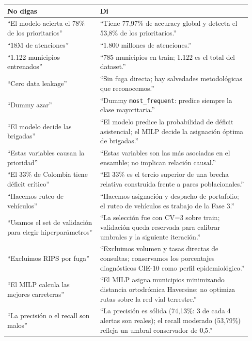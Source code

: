\documentclass[11pt,a4paper]{article}
\newcommand{\code}[1]{\texttt{#1}}
\begin{document}
\begin{table}[H]
\centering
\small
\begin{tabularx}{\textwidth}{@{}L{7.0cm} Y@{}}
\toprule
\textbf{No digas} & \textbf{Di} \\
\midrule
``El modelo acierta el 78\% de los prioritarios'' &
``Tiene 77,97\% de accuracy global y detecta el 53,8\% de los prioritarios.'' \\
``18M de atenciones'' &
``1.800 millones de atenciones.'' \\
``1.122 municipios entrenados'' &
``785 municipios en train; 1.122 es el total del dataset.'' \\
``Cero data leakage'' &
``Sin fuga directa; hay salvedades metodológicas que reconocemos.'' \\
``Dummy azar'' &
``Dummy \code{most_frequent}: predice siempre la clase mayoritaria.'' \\
``El modelo decide las brigadas'' &
``El modelo predice la probabilidad de déficit asistencial; el MILP decide la asignación óptima de brigadas.'' \\
``Estas variables causan la prioridad'' &
``Estas variables son las más asociadas en el ensamble; no implican relación causal.'' \\
``El 33\% de Colombia tiene déficit crítico'' &
``El 33\% es el tercio superior de una brecha relativa construida frente a pares poblacionales.'' \\
``Hacemos ruteo de vehículos'' &
``Hacemos asignación y despacho de portafolio; el ruteo de vehículos es trabajo de la Fase 3.'' \\
``Usamos el set de validación para elegir hiperparámetros'' &
``La selección fue con CV=3 sobre train; validación queda reservada para calibrar umbrales y la siguiente iteración.'' \\
``Excluimos RIPS por fuga'' &
``Excluimos volumen y tasas directas de consultas; conservamos los porcentajes diagnósticos CIE-10 como perfil epidemiológico.'' \\
``El MILP calcula las mejores carreteras'' &
``El MILP asigna municipios minimizando distancia ortodrómica Haversine; no optimiza rutas sobre la red vial terrestre.'' \\
``La precisión o el recall son malos'' &
``La precisión es sólida (74,13\%: 3 de cada 4 alertas son reales); el recall moderado (53,79\%) refleja un umbral conservador de 0,5.'' \\
\bottomrule
\end{tabularx}
\end{table}
\end{document}
